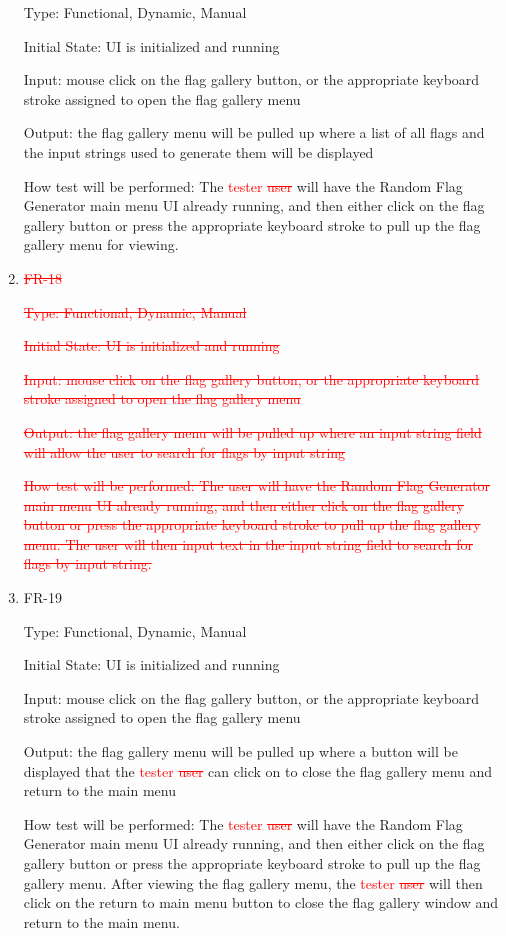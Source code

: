 \documentclass[12pt, titlepage]{article}
\begin{document}
\begin{enumerate}
Type: Functional, Dynamic, Manual

Initial State: UI is initialized and running

Input: mouse click on the flag gallery button, or the appropriate keyboard
stroke assigned to open the flag gallery menu

Output: the flag gallery menu will be pulled up where a list of all flags and
the input strings used to generate them will be displayed

How test will be performed: The \textcolor{red}{tester \sout{user}} will have
the Random Flag Generator main menu UI already running, and then either click
on the flag gallery button or press the appropriate keyboard stroke to pull up
the flag gallery menu for viewing.

\item{\textcolor{red}{\sout{FR-18}}\\}

\textcolor{red}{\sout{Type: Functional, Dynamic, Manual}}

\textcolor{red}{\sout{Initial State: UI is initialized and running}}

\textcolor{red}{\sout{Input: mouse click on the flag gallery button, or the
appropriate keyboard stroke assigned to open the flag gallery menu}}

\textcolor{red}{\sout{Output: the flag gallery menu will be pulled up where an
input string field will allow the user to search for flags by input string}}

\textcolor{red}{\sout{How test will be performed: The user will have the
Random Flag Generator main menu UI already running, and then either click on
the flag gallery button or press the appropriate keyboard stroke to pull up
the flag gallery menu. The user will then input text in the input string field
to search for flags by input string.}}

\item{FR-19\\}

Type: Functional, Dynamic, Manual

Initial State: UI is initialized and running

Input: mouse click on the flag gallery button, or the appropriate keyboard
stroke assigned to open the flag gallery menu

Output: the flag gallery menu will be pulled up where a button will be
displayed that the \textcolor{red}{tester \sout{user}} can click on to close
the flag gallery menu and return to the main menu

How test will be performed: The \textcolor{red}{tester \sout{user}} will have
the Random Flag Generator main menu UI already running, and then either click
on the flag gallery button or press the appropriate keyboard stroke to pull up
the flag gallery menu. After viewing the flag gallery menu, the
\textcolor{red}{tester \sout{user}} will then click on the return to main menu
button to close the flag gallery window and return to the main menu.

\end{enumerate}
\end{document}
